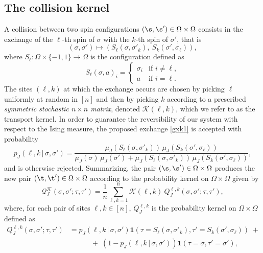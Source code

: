 \documentclass[11pt,reqno]{amsart}
\numberwithin{equation}{section}
\numberwithin{figure}{section}
\newcommand{\1}{\mathds{1}}
\let\si=\sigma
\let\O=\Omega
\newcommand{\cK}{\ensuremath{\mathcal K}}
\begin{document}

\subsection{The collision kernel}
A collision between two spin configurations $(\s,\s')\in\Omega\times\Omega$ consists in the exchange of the $\ell$-th spin of $\si$ with the $k$-th spin of $\si'$, that is 
\begin{equation}\label{gxk1}
(\sigma, \sigma') \mapsto \left(S_\ell(\sigma, \sigma'_k),\ S_k(\sigma', \sigma_\ell)\right),
\end{equation}
where \(S_\ell: \O\times\{-1,1\}\to \Omega \) is the configuration defined as
\[
S_\ell(\sigma, a)_i = 
\begin{cases}
    \sigma_i & \text{if } i \neq \ell, \\
    a & \text{if } i = \ell.
\end{cases}
\]
The sites $(\ell,k)$ at which the exchange occurs are chosen by picking $\ell$ uniformly at random in $[n]$ and then by picking $k$ according to a prescribed {\em symmetric stochastic $n\times n$ matrix},  denoted $\cK(\ell,k)$, which we refer to as the transport kernel.  In order to guarantee the reversibility of our system with respect to the Ising measure, the proposed exchange \eqref{gxk1} is accepted with probability 
 \begin{equation}\label{gxk3}
    p_J(\ell,k\,|\,\sigma,\sigma')=
       \frac{ \mu_J(S_\ell(\sigma, \sigma'_k))\, \mu_J(S_k(\sigma', \sigma_\ell))}{ \mu_J(\sigma)\, \mu_J(\sigma')+ \mu_J(S_{\ell}(\sigma, \sigma'_{k}))
      \, \mu_J(S_{k}(\sigma', \sigma_{\ell}))},
\end{equation}
and is otherwise rejected. 
Summarizing, the pair $(\s,\s')\in\Omega\times\Omega$ produces the new pair $(\t,\t')\in\Omega\times\Omega$ according to the probability kernel on $\Omega\times\Omega$ given by 
\begin{equation}\label{gxk2}
    \mathcal{Q}_J^\mathcal{K}(\sigma, \sigma'; \tau, \tau') = \frac1n\sum_{\ell, k = 1}^n \mathcal{K}(\ell, k)\ Q_J^{\ell,k}(\sigma, \sigma'; \tau, \tau'),
\end{equation}
where, for each pair of sites $\ell,k\in[n]$, $Q_J^{\ell,k}$ is the probability kernel on $\Omega\times\Omega$ defined as
\begin{align}\label{gxk4}
Q_J^{\ell,k}(\sigma, \sigma'; \tau, \tau')
     & =    p_J(\ell,k\,|\,\sigma,\sigma') \mathbf{1}(\tau = S_\ell(\sigma, \sigma'_k),\tau' = S_k(\sigma', \sigma_\ell)) \;+\;
    \nonumber \\ & \qquad\quad + \;( 1-  p_J(\ell,k\,|\,\sigma,\sigma')) \mathbf{1}(\tau = \sigma,\tau'=\sigma'),
    \end{align}
\end{document}
